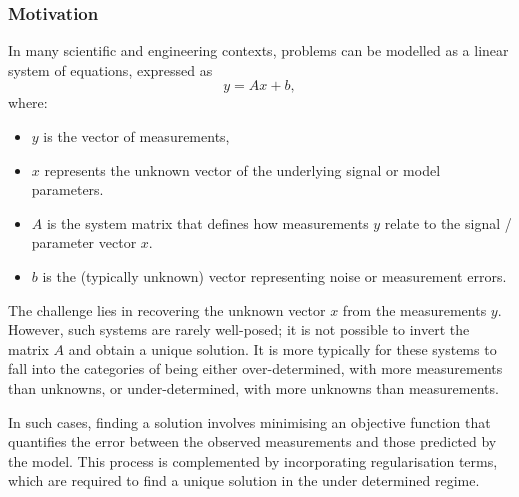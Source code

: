\documentclass[11pt]{article}
\begin{document}
\subsubsection{Motivation}
In many scientific and engineering contexts, problems can be modelled as a linear system of equations, expressed as 
\[
y = Ax + b,
\]
where:
\begin{itemize}
    \item \(y\) is the vector of measurements,
    \item \(x\) represents the unknown vector of the underlying signal or model parameters.
    \item \(A\) is the system matrix that defines how measurements \(y\) relate to the signal / parameter vector \(x\).
    \item \(b\) is the (typically unknown) vector representing noise or measurement errors.
\end{itemize}

The challenge lies in recovering the unknown vector \(x\) from the measurements \(y\). However, such systems are rarely well-posed; it is not possible to invert the matrix \(A\) and obtain a unique solution. It is more typically for these systems to fall into the categories of being either over-determined, with more measurements than unknowns, or under-determined, with more unknowns than measurements.

In such cases, finding a solution involves minimising an objective function that quantifies the error between the observed measurements and those predicted by the model. This process is complemented by incorporating regularisation terms, which are required to find a unique solution in the under determined regime. 
\end{document}
